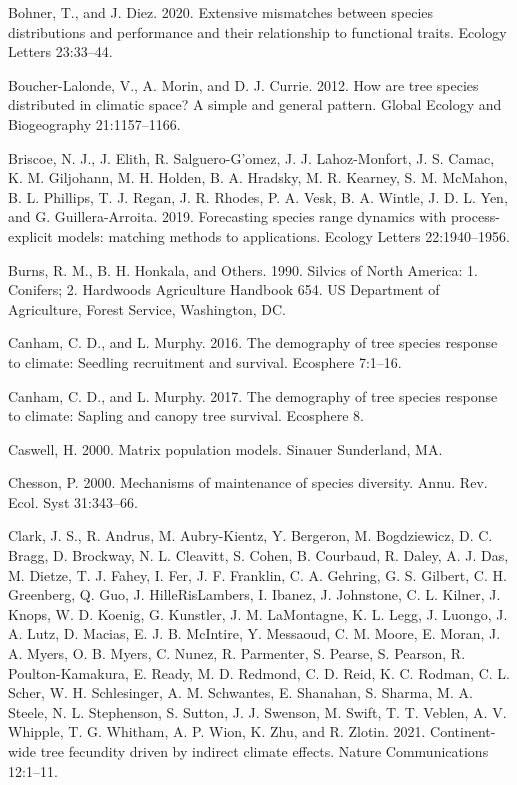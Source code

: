 \documentclass[12pt]{article}
\newlength{\cslhangindent}
\newenvironment{cslreferences}%
  {\setlength{\parindent}{0pt}%
  \everypar{\setlength{\hangindent}{\cslhangindent}}\ignorespaces}%
  {\par}
\begin{document}
\hypertarget{refs}{}
\begin{cslreferences}
\leavevmode\hypertarget{ref-bohner2020}{}%
Bohner, T., and J. Diez. 2020. Extensive mismatches between species
distributions and performance and their relationship to functional
traits. Ecology Letters 23:33--44.

\leavevmode\hypertarget{ref-BoucherLalonde2012}{}%
Boucher-Lalonde, V., A. Morin, and D. J. Currie. 2012. How are tree
species distributed in climatic space? A simple and general pattern.
Global Ecology and Biogeography 21:1157--1166.

\leavevmode\hypertarget{ref-Briscoe2019}{}%
Briscoe, N. J., J. Elith, R. Salguero-G\a'omez, J. J. Lahoz-Monfort, J.
S. Camac, K. M. Giljohann, M. H. Holden, B. A. Hradsky, M. R. Kearney,
S. M. McMahon, B. L. Phillips, T. J. Regan, J. R. Rhodes, P. A. Vesk, B.
A. Wintle, J. D. L. Yen, and G. Guillera-Arroita. 2019. Forecasting
species range dynamics with process-explicit models: matching methods to
applications. Ecology Letters 22:1940--1956.

\leavevmode\hypertarget{ref-burns1990silvics}{}%
Burns, R. M., B. H. Honkala, and Others. 1990. Silvics of North America:
1. Conifers; 2. Hardwoods Agriculture Handbook 654. US Department of
Agriculture, Forest Service, Washington, DC.

\leavevmode\hypertarget{ref-Canham2016}{}%
Canham, C. D., and L. Murphy. 2016. The demography of tree species
response to climate: Seedling recruitment and survival. Ecosphere
7:1--16.

\leavevmode\hypertarget{ref-Canham2017}{}%
Canham, C. D., and L. Murphy. 2017. The demography of tree species
response to climate: Sapling and canopy tree survival. Ecosphere 8.

\leavevmode\hypertarget{ref-Caswell2000}{}%
Caswell, H. 2000. Matrix population models. Sinauer Sunderland, MA.

\leavevmode\hypertarget{ref-Chesson2000a}{}%
Chesson, P. 2000. Mechanisms of maintenance of species diversity. Annu.
Rev. Ecol. Syst 31:343--66.

\leavevmode\hypertarget{ref-Clark2021}{}%
Clark, J. S., R. Andrus, M. Aubry-Kientz, Y. Bergeron, M. Bogdziewicz,
D. C. Bragg, D. Brockway, N. L. Cleavitt, S. Cohen, B. Courbaud, R.
Daley, A. J. Das, M. Dietze, T. J. Fahey, I. Fer, J. F. Franklin, C. A.
Gehring, G. S. Gilbert, C. H. Greenberg, Q. Guo, J. HilleRisLambers, I.
Ibanez, J. Johnstone, C. L. Kilner, J. Knops, W. D. Koenig, G. Kunstler,
J. M. LaMontagne, K. L. Legg, J. Luongo, J. A. Lutz, D. Macias, E. J. B.
McIntire, Y. Messaoud, C. M. Moore, E. Moran, J. A. Myers, O. B. Myers,
C. Nunez, R. Parmenter, S. Pearse, S. Pearson, R. Poulton-Kamakura, E.
Ready, M. D. Redmond, C. D. Reid, K. C. Rodman, C. L. Scher, W. H.
Schlesinger, A. M. Schwantes, E. Shanahan, S. Sharma, M. A. Steele, N.
L. Stephenson, S. Sutton, J. J. Swenson, M. Swift, T. T. Veblen, A. V.
Whipple, T. G. Whitham, A. P. Wion, K. Zhu, and R. Zlotin. 2021.
Continent-wide tree fecundity driven by indirect climate effects. Nature
Communications 12:1--11.


\end{cslreferences}
\end{document}
